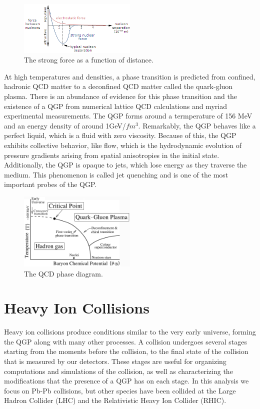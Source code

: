 \begin{figure}
    \centering
    \includegraphics[width=0.5\textwidth]{figures/png/strong_force.png}
    \caption{The strong force as a function of distance.}\label{fig:strong_force}
\end{figure}

At high temperatures and densities, a phase transition is predicted from confined, hadronic QCD matter to a deconfined QCD matter called the quark-gluon plasma. There is an abundance of evidence for this phase transition and the existence of a QGP from numerical lattice QCD calculations and myriad experimental measurements. The QGP forms around a termperature of 156 MeV~\cite{QCDTemp} and an energy density of around 1GeV/$fm^3$. Remarkably, the QGP behaves like a perfect liquid, which is a fluid with zero viscosity. Because of this, the QGP exhibits collective behavior, like flow, which is the hydrodynamic evolution of pressure gradients arising from spatial anisotropies in the initial state. Additionally, the QGP is opaque to jets, which lose energy as they traverse the medium. This phenomenon is called jet quenching and is one of the most important probes of the QGP. 

\begin{figure}
    \centering
    \includegraphics[width=0.5\textwidth]{figures/png/phase_diagram.jpg}
    \caption{The QCD phase diagram.}\label{fig:phase_diagram}
\end{figure}

\section{Heavy Ion Collisions}

Heavy ion collisions produce conditions similar to the very early universe, forming the QGP along with many other processes. A collision undergoes several stages starting from the moments before the collision, to the final state of the collision that is measured by our detectors. These stages are useful for organizing computations and simulations of the collision, as well as characterizing the modifications that the presence of a QGP has on each stage. In this analysis we focus on Pb-Pb collisions, but other species have been collided at the Large Hadron Collider (LHC) and the Relativistic Heavy Ion Collider (RHIC).

